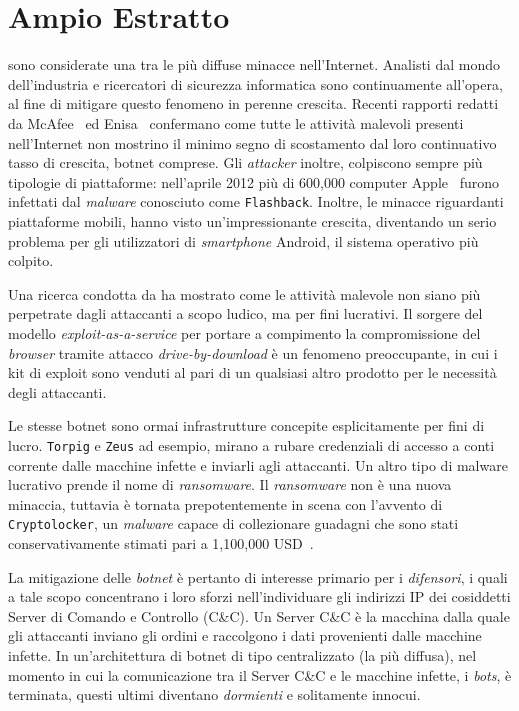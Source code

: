 \chapter*{Ampio Estratto}
 sono considerate una tra le più diffuse minacce nell'Internet.
Analisti dal mondo dell'industria e ricercatori di sicurezza informatica sono
continuamente all'opera, al fine di mitigare questo fenomeno in perenne crescita.
Recenti rapporti redatti da McAfee~\cite{mcafee2013} ed Enisa~\cite{enisa2013}
confermano come tutte le attività malevoli presenti nell'Internet non mostrino il
minimo segno di scostamento dal loro continuativo tasso di crescita, botnet comprese.
Gli \emph{attacker} inoltre, colpiscono sempre più tipologie di piattaforme:
nell'aprile 2012 più di 600,000 computer Apple~\cite{enisa2012} furono infettati
dal \emph{malware} conosciuto come \texttt{Flashback}.
Inoltre, le minacce riguardanti piattaforme mobili, hanno visto un'impressionante
crescita, diventando un serio problema per gli utilizzatori di \emph{smartphone}
Android, il sistema operativo più colpito.

Una ricerca condotta da \citet{grier2012manufacturing} ha mostrato come
le attività malevole non siano più perpetrate dagli attaccanti a scopo ludico, ma
per fini lucrativi. Il sorgere del modello \emph{exploit-as-a-service} per
portare a compimento la compromissione del \emph{browser} tramite attacco
\emph{drive-by-download} è un fenomeno preoccupante, in cui i kit di exploit sono
venduti al pari di un qualsiasi altro prodotto per le necessità degli attaccanti.

Le stesse botnet sono ormai infrastrutture concepite esplicitamente per fini di lucro.
\texttt{Torpig} e \texttt{Zeus} ad esempio, mirano a rubare credenziali di accesso
a conti corrente dalle macchine infette e inviarli agli attaccanti. Un altro
tipo di malware lucrativo prende il nome di \emph{ransomware}.
Il \emph{ransomware} non è una nuova minaccia, tuttavia è tornata prepotentemente
in scena con l'avvento di \texttt{Cryptolocker}, un \emph{malware} capace di
collezionare guadagni che sono stati conservativamente stimati pari a
1,100,000 USD~\cite{spagnuolo2013}.

La mitigazione delle \emph{botnet} è pertanto di interesse primario per i \emph{difensori}, i quali a tale scopo concentrano i loro sforzi nell'individuare gli indirizzi
IP dei cosiddetti Server di Comando e Controllo (C\&C). Un Server C\&C è la
macchina dalla quale gli attaccanti inviano gli ordini e raccolgono i dati
provenienti dalle macchine infette. In un'architettura di botnet di tipo
centralizzato (la più diffusa), nel momento in cui la comunicazione tra il Server
C\&C e le macchine infette, i \emph{bots}, è terminata, questi ultimi diventano
\emph{dormienti} e solitamente innocui.

